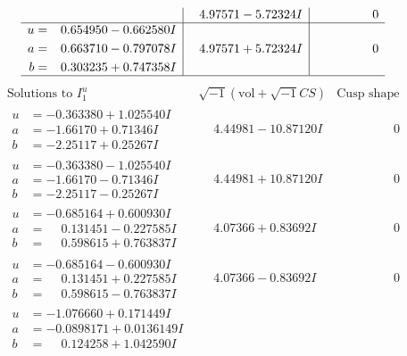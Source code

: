 \documentclass[1p]{elsarticle_modified}
\theoremstyle{definition}
\newcommand{\I}{\sqrt{-1}}
\begin{document}
$$\begin{array}{c|c|c}
 & \phantom{-}4.97571 - 5.72324 I & \phantom{-0.000000 } 0 \\ \hline\begin{aligned}
u &= \phantom{-}0.654950 - 0.662580 I \\
a &= \phantom{-}0.663710 - 0.797078 I \\
b &= \phantom{-}0.303235 + 0.747358 I\end{aligned}
 & \phantom{-}4.97571 + 5.72324 I & \phantom{-0.000000 } 0\\
 \hline 
 \end{array}$$\newpage$$\begin{array}{c|c|c}  
\text{Solutions to }I^u_{1}& \I (\text{vol} + \sqrt{-1}CS) & \text{Cusp shape}\\
 \hline 
\begin{aligned}
u &= -0.363380 + 1.025540 I \\
a &= -1.66170 + 0.71346 I \\
b &= -2.25117 + 0.25267 I\end{aligned}
 & \phantom{-}4.44981 - 10.87120 I & \phantom{-0.000000 } 0 \\ \hline\begin{aligned}
u &= -0.363380 - 1.025540 I \\
a &= -1.66170 - 0.71346 I \\
b &= -2.25117 - 0.25267 I\end{aligned}
 & \phantom{-}4.44981 + 10.87120 I & \phantom{-0.000000 } 0 \\ \hline\begin{aligned}
u &= -0.685164 + 0.600930 I \\
a &= \phantom{-}0.131451 - 0.227585 I \\
b &= \phantom{-}0.598615 + 0.763837 I\end{aligned}
 & \phantom{-}4.07366 + 0.83692 I & \phantom{-0.000000 } 0 \\ \hline\begin{aligned}
u &= -0.685164 - 0.600930 I \\
a &= \phantom{-}0.131451 + 0.227585 I \\
b &= \phantom{-}0.598615 - 0.763837 I\end{aligned}
 & \phantom{-}4.07366 - 0.83692 I & \phantom{-0.000000 } 0 \\ \hline\begin{aligned}
u &= -1.076660 + 0.171449 I \\
a &= -0.0898171 + 0.0136149 I \\
b &= \phantom{-}0.124258 + 1.042590 I\end{aligned}

\end{array}$$
\end{document}
